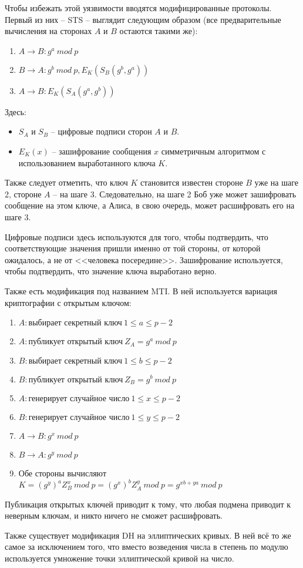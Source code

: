 Чтобы избежать этой уязвимости вводятся модифицированные протоколы. Первый из них -- STS -- выглядит следующим образом (все предварительные вычисления на сторонах $A$ и $B$ остаются такими же):

\begin{enumerate}
	\item $A \rightarrow B: g^a\ mod\ p$
	\item $B \rightarrow A: g^b\ mod\ p, E_K(S_B(g^b, g^a))$
	\item $A \rightarrow B: E_K(S_A(g^a, g^b))$
\end{enumerate}

Здесь:

\begin{itemize}
	\item $S_A$ и $S_B$ -- цифровые подписи сторон $A$ и $B$.
	\item $E_K(x)$ -- зашифрование сообщения $x$ симметричным алгоритмом с использованием выработанного ключа $K$.  
\end{itemize}

Также следует отметить, что ключ $K$ становится известен стороне $B$ уже на шаге 2, стороне $A$ -- на шаге 3. Следовательно, на шаге 2 Боб уже может зашифровать сообщение на этом ключе, а Алиса, в свою очередь, может расшифровать его на шаге 3.

Цифровые подписи здесь используются для того, чтобы подтвердить, что соответствующие значения пришли именно от той стороны, от которой ожидалось, а не от <<человека посередине>>. Зашифрование используется, чтобы подтвердить, что значение ключа выработано верно.

Также есть модификация под названием MTI. В ней используется вариация криптографии с открытым ключом:

\begin{enumerate}
	\item $A: \text{выбирает секретный ключ}\ 1 \leq a \leq p - 2$
	\item $A: \text{публикует открытый ключ}\ Z_A = g^a\ mod\ p$
	\item $B: \text{выбирает секретный ключ}\ 1 \leq b \leq p - 2$
	\item $B: \text{публикует открытый ключ}\ Z_B = g^b\ mod\ p$
	\item $A: \text{генерирует случайное число}\ 1 \leq x \leq p - 2$
	\item $B: \text{генерирует случайное число}\ 1 \leq y \leq p - 2$
	\item $A \rightarrow B: g^x\ mod\ p$
	\item $B \rightarrow A: g^y\ mod\ p$
	\item Обе стороны вычисляют $K = (g^y)^aZ_B^x\ mod\ p = (g^x)^bZ_A^y\ mod\ p = g^{xb + ya}\ mod\ p$	
\end{enumerate}

Публикация открытых ключей приводит к тому, что любая подмена приводит к неверным ключам, и никто ничего не сможет расшифровать.

Также существует модификация DH на эллиптических кривых. В ней всё то же самое за исключением того, что вместо возведения числа в степень по модулю используется умножение точки эллиптической кривой на число. 



